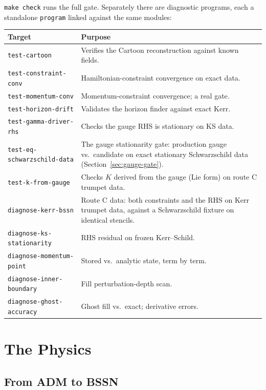 \documentclass[11pt,openany]{book}
\begin{document}
\texttt{make check} runs the full gate. Separately there are diagnostic
programs, each a standalone \texttt{program} linked against the same modules:

\begin{longtable}{@{}>{\raggedright\arraybackslash}p{4.50cm}>{\raggedright\arraybackslash}p{9.08cm}@{}}
\toprule
\textbf{Target} & \textbf{Purpose} \\
\midrule
\endhead
\texttt{test-cartoon} & Verifies the Cartoon reconstruction against known fields. \\
\texttt{test-constraint-conv} & Hamiltonian-constraint convergence on exact data. \\
\texttt{test-momentum-conv} & Momentum-constraint convergence; a real gate. \\
\texttt{test-horizon-drift} & Validates the horizon finder against exact Kerr. \\
\texttt{test-gamma-driver-rhs} & Checks the gauge RHS is stationary on KS data. \\
\texttt{test-eq-schwarzschild-data} & The gauge stationarity gate: production gauge vs.\ candidate on exact stationary Schwarzschild data (Section~\ref{sec:gauge-gate}). \\
\texttt{test-k-from-gauge} & Checks $K$ derived from the gauge (Lie form) on route C trumpet data. \\
\texttt{diagnose-kerr-bssn} & Route C data: both constraints and the RHS on Kerr trumpet data, against a Schwarzschild fixture on identical stencils. \\
\texttt{diagnose-ks-stationarity} & RHS residual on frozen Kerr--Schild. \\
\texttt{diagnose-momentum-point} & Stored vs.\ analytic state, term by term. \\
\texttt{diagnose-inner-boundary} & Fill perturbation-depth scan. \\
\texttt{diagnose-ghost-accuracy} & Ghost fill vs.\ exact; derivative errors. \\
\bottomrule
\end{longtable}

\chapter{The Physics}
\label{ch:physics}

\section{From ADM to BSSN}
\end{document}
